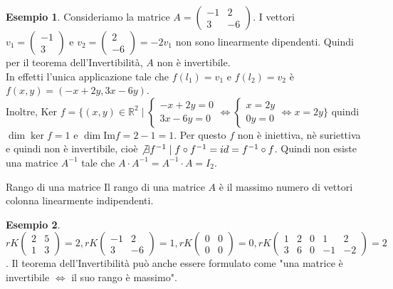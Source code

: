 \documentclass[a4paper]{article}
\theoremstyle{definition}
\newtheorem*{es}{Esempio}
\begin{document}
\begin{es}
	Consideriamo la matrice $A = \begin{pmatrix}
			-1 & 2  \\
			3  & -6
		\end{pmatrix}$. I vettori $v_1 = \begin{pmatrix}
			-1 \\
			3
		\end{pmatrix} \text{ e } v_2 = \begin{pmatrix}
			2 \\
			-6
		\end{pmatrix} = -2v_1$ non sono linearmente dipendenti. Quindi per il teorema dell'Invertibilità, $A$ non è invertibile. \\
	In effetti l'unica applicazione tale che $f(l_1) = v_1$ e $f(l_2) = v_2$ è $f(x, y) = (-x + 2y, 3x - 6y)$. \\
	Inoltre, Ker $f = \{(x, y) \in \mathbb{R}^2 \mid \begin{cases}
			-x + 2y = 0 \\
			3x - 6y = 0
		\end{cases} \Leftrightarrow \begin{cases}
			x = 2y \\
			0y = 0
		\end{cases} \Leftrightarrow x = 2y\}$ quindi $\dim \ker f = 1$ e $\dim \text{Im} f = 2 - 1 = 1$.
	Per questo $f$ non è iniettiva, nè suriettiva e quindi non è invertibile, cioè $\not\exists f^{-1} \mid f \circ f^{-1} = id = f^{-1} \circ f$.
	Quindi non esiste una matrice $A^{-1}$ tale che $A \cdot A^{-1} = A^{-1} \cdot A = I_2$.
\end{es}
\begin{deff}{Rango di una matrice}{}
	Il rango di una matrice $A$ è il massimo numero di vettori colonna linearmente indipendenti.
\end{deff}
\begin{es}
	$rK\begin{pmatrix}
			2 & 5 \\
			1 & 3
		\end{pmatrix} = 2, rK\begin{pmatrix}
			-1 & 2  \\
			3  & -6
		\end{pmatrix} = 1, rK\begin{pmatrix}
			0 & 0 \\
			0 & 0
		\end{pmatrix} = 0, rK\begin{pmatrix}
			1 & 2 & 0 & 1  & 2  \\
			3 & 6 & 0 & -1 & -2
		\end{pmatrix} = 2$.
	Il teorema dell'Invertibilità può anche essere formulato come "una matrice è invertibile $\Leftrightarrow$ il suo rango è massimo".
\end{es}
\end{document}
